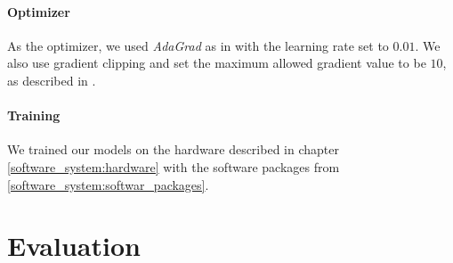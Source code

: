 \paragraph{Optimizer} As the optimizer, we used \emph{AdaGrad} \cite{Duchi:2011} as in \cite{Vinyals:2015} with the learning rate set to $0.01$. We also use gradient clipping and set the maximum allowed gradient value to be $10$, as described in \cite{Pascanu:2013}.

\paragraph{Training} We trained our models on the hardware described in chapter \ref{software_system:hardware} with the software packages from \ref{software_system:softwar_packages}.

\section{Evaluation}
\blindtext
